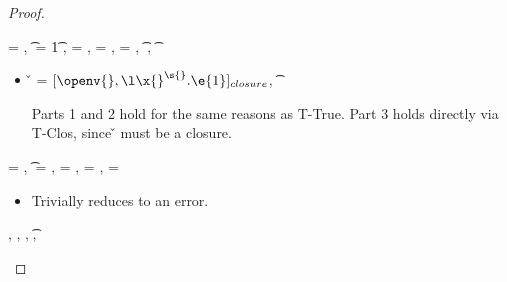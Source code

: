 \begin{lemma}
\begin{proof}
\begin{case}[T-Abs] \e{} = {\abs {\x{}} {\s{}} {}},
  \t{} = {\ArrowOne {\x{}} {\s{}}
                                                      {\t{1}}
                                                      {
                                                                  {}}
                                                      {}},
  {\thenprop{\prop{}}}= {\topprop{}},
  {\elseprop{\prop{}}}= {\botprop{}},
  {\object{}}= {\emptyobject{}},
{ \judgement {\propenv{}, {\isprop {\s{}} {\x{}}}}
            { {\t{}}}
             {
                         {}}
             {}},
\judgement {\propenv{}} { {\t{}}}
                 {\filterset {\thenprop {\prop{}}}
                             {\elseprop {\prop{}}}}
                 {\object{}}

  \begin{itemize}
    \item[]
      \begin{subcase}[B-Abs]
        \v{} = ${\closure {\openv{}} {\abs {\x{}} {\s{}} {\e{1}}}}$,
          { \opsem {\openv{}}
                   {\abs {\x{}} {\t{}} {}}
                   {\closure {\openv{}} {\abs {\x{}} {\s{}} {}}}}

        Parts 1 and 2 hold for the same reasons as T-True.
        Part 3 holds directly via T-Clos, since \v{} must be a closure.
      \end{subcase}
  \end{itemize}
\end{case}

\begin{case}[T-Error]
  \e{} = ,
  \t{} = \Bot,
  \thenprop{\prop{}} = \botprop{}, \elseprop{\prop{}} = \botprop{}, \object{} = \emptyobject{}


  \begin{itemize}
    \item[]
      \begin{subcase}[BE-Error] 
        \opsem {\openv{}} {\e{}} {}

        Trivially reduces to an error.
      \end{subcase}
  \end{itemize}
\end{case}

\begin{case}[T-Subsume]
  \judgement {\propenv{}} {\hastype {\e{}} {\tp{}}}
             {\filterset {\thenprop {\propp{}}}
                         {\elseprop {\propp{}}}}
             {\objectp{}},
\inpropenv {\propenv{}, {\thenprop {\propp{}}}} {\thenprop {\prop{}}},
\inpropenv {\propenv{}, {\elseprop {\propp{}}}} {\elseprop {\prop{}}},
\inpropenv {} {\issubtype {\tp{}} {\t{}}},
\inpropenv {} {\issubtype {\objectp{}} {\object{}}}


\end{case}
\end{proof}
\end{lemma}

